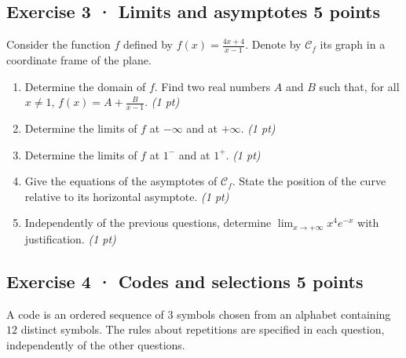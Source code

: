 \mxnewpage{}

\subsection*{Exercise 3 · Limits and asymptotes \hfill 5 points}Consider the function $f$ defined by $f(x)=\frac{4x+4}{x-1}$. Denote by $\mathcal C_f$ its graph in a coordinate frame of the plane.

\begin{enumerate}

\item Determine the domain of $f$. Find two real numbers $A$ and $B$ such that, for all $x\ne1$, $f(x)=A+\frac B{x-1}$. \hfill\textit{(1 pt)}

\item Determine the limits of $f$ at $-\infty$ and at $+\infty$. \hfill\textit{(1 pt)}

\item Determine the limits of $f$ at $1^-$ and at $1^+$. \hfill\textit{(1 pt)}

\item Give the equations of the asymptotes of $\mathcal C_f$. State the position of the curve relative to its horizontal asymptote. \hfill\textit{(1 pt)}

\item Independently of the previous questions, determine $\displaystyle\lim_{x\to+\infty}x^{4}e^{-x}$ with justification. \hfill\textit{(1 pt)}

\end{enumerate}

\subsection*{Exercise 4 · Codes and selections \hfill 5 points}A code is an ordered sequence of $3$ symbols chosen from an alphabet containing $12$ distinct symbols. The rules about repetitions are specified in each question, independently of the other questions.

